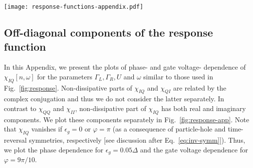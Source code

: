 \documentclass[aps,reprint,longbibliography, prb]{revtex4-2}
\begin{document}
\begin{figure*}[t]
  \begin{center}
    \texttt{[image: response-functions-appendix.pdf]}
    \caption{The response function $\chi_{IQ}$ in states $|0\rangle$, $|1_\sigma\rangle$, $|2\rangle$ with different number of quasiparticles at the ABS. $\mathrm{Re}\,\chi_{IQ}$ is plotted as a function of $\varphi$ in panel (a) [for $\epsilon_g = 0.05\Delta$] and as a function of $\epsilon_g$ in panel (b) [for $\varphi = 9\pi/10$]; $\mathrm{Im}\,\chi_{IQ}$ is plotted as a function of $\varphi$ in panel (c) [for $\epsilon_g = 0.05\Delta$] and as a function of $\epsilon_g$ in panel (d) [for $\varphi = 9\pi/10$]. The plots are produced using Eqs.~\eqref{eq:response}, \eqref{eq:0=-2}, \eqref{eq:chi-IQ}, for parameters $\Gamma_L = 0.3 \Delta$, $\Gamma_R = 0.35 \Delta$, $U = 0.35 \Delta$, and $\hbar\omega = 0.21 \Delta$ [these parameters are similar to that in Fig.~\ref{fig:response}]. The response functions in states $|0\rangle$ and $|2\rangle$ diverge when the frequency is in resonance with the transition between $|0\rangle$ and $|2\rangle$, \textit{i.e.}, when $\hbar\omega = 2E_A$ (vertical dashed lines in the plots). Generally, the response function $\chi_{IQ}$ in the odd states is small compared to that in the even states. We note that, away from resonances, both ${\rm Re}\,\chi_{IQ}$ and ${\rm Im}\,\chi_{IQ}$ describe the non-dissipative response. The dissipative part of the response functions --- which is present at resonances only --- is not shown in the plot.}
    \label{fig:response-app}
  \end{center}
\end{figure*}

\subsection{Off-diagonal components of the response function\label{app:iq-and-qi}}
In this Appendix, we present the plots of phase- and gate voltage- dependence of $\chi_{IQ}[n, \omega]$ for the parameters $\Gamma_L, \Gamma_R, U$ and $\omega$ similar to those used in Fig.~\ref{fig:response}. Non-dissipative parts of  $\chi_{IQ}$ and $\chi_{QI}$ are related by the complex conjugation and thus we do not consider the latter separately. In contrast to $\chi_{QQ}$ and $\chi_{II}$, non-dissipative part of  $\chi_{IQ}$ has both real and imaginary components. We plot these components separately in Fig.~\ref{fig:response-app}. Note that $\chi_{IQ}$ vanishes if $\epsilon_g = 0$ or $\varphi = \pi$ (as a consequence of particle-hole and time-reversal symmetries, respectively [see discussion after Eq.~\eqref{eq:inv-symm}]). Thus, we plot the phase dependence for $\epsilon_g = 0.05\Delta$ and the gate voltage dependence for $\varphi = 9 \pi / 10$.
\end{document}
